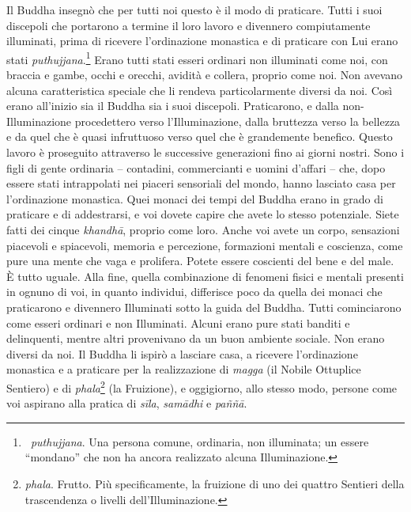 Il Buddha insegnò che per tutti noi questo è il modo di praticare. Tutti
i suoi discepoli che portarono a termine il loro lavoro e divennero
compiutamente illuminati, prima di ricevere l'ordinazione monastica e di
praticare con Lui erano stati \emph{puthujjana}.\footnote{\emph{~puthujjana}.
  Una persona comune, ordinaria, non illuminata; un essere ``mondano''
  che non ha ancora realizzato alcuna Illuminazione.} Erano tutti stati
esseri ordinari non illuminati come noi, con braccia e gambe, occhi e
orecchi, avidità e collera, proprio come noi. Non avevano alcuna
caratteristica speciale che li rendeva particolarmente diversi da noi.
Così erano all'inizio sia il Buddha sia i suoi discepoli. Praticarono, e
dalla non-Illuminazione procedettero verso l'Illuminazione, dalla
bruttezza verso la bellezza e da quel che è quasi infruttuoso verso quel
che è grandemente benefico. Questo lavoro è proseguito attraverso le
successive generazioni fino ai giorni nostri. Sono i figli di gente
ordinaria -- contadini, commercianti e uomini d'affari -- che, dopo
essere stati intrappolati nei piaceri sensoriali del mondo, hanno
lasciato casa per l'ordinazione monastica. Quei monaci dei tempi del
Buddha erano in grado di praticare e di addestrarsi, e voi dovete capire
che avete lo stesso potenziale. Siete fatti dei cinque \emph{khandhā},
proprio come loro. Anche voi avete un corpo, sensazioni piacevoli e
spiacevoli, memoria e percezione, formazioni mentali e coscienza, come
pure una mente che vaga e prolifera. Potete essere coscienti del bene e
del male. È tutto uguale. Alla fine, quella combinazione di fenomeni
fisici e mentali presenti in ognuno di voi, in quanto individui,
differisce poco da quella dei monaci che praticarono e divennero
Illuminati sotto la guida del Buddha. Tutti cominciarono come esseri
ordinari e non Illuminati. Alcuni erano pure stati banditi e
delinquenti, mentre altri provenivano da un buon ambiente sociale. Non
erano diversi da noi. Il Buddha li ispirò a lasciare casa, a ricevere
l'ordinazione monastica e a praticare per la realizzazione di
\emph{magga} (il Nobile Ottuplice Sentiero) e di \emph{phala}\footnote{\emph{phala}.
  Frutto. Più specificamente, la fruizione di uno dei quattro Sentieri
  della trascendenza o livelli dell'Illuminazione.} (la Fruizione), e
oggigiorno, allo stesso modo, persone come voi aspirano alla pratica di
\emph{sīla}, \emph{samādhi} e \emph{paññā}.

